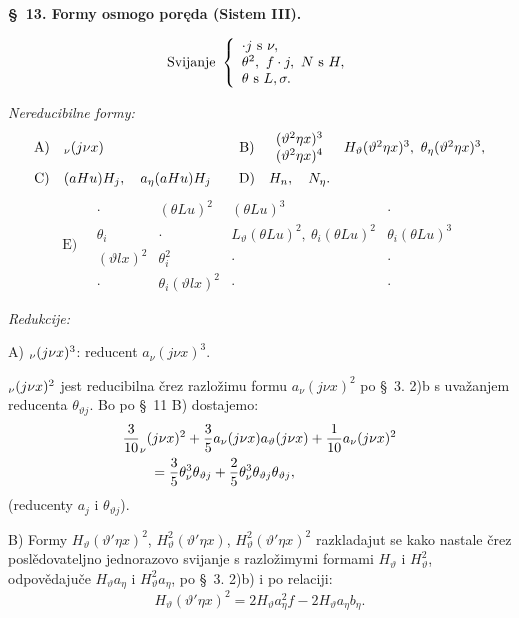 \documentclass[11pt]{article}
\let\A\relax
\newcommand{\A}{\mathfrak A}
\begin{document}
\begin{center}
\textbf{\S\ 13. \quad Formy osmogo poręda (Sistem III).}
\end{center}
\[
\text{Svijanje }\left\{\begin{array}{l}
\A\cdot j \text{ s }\nu,\\
\theta^2,\ f\cdot j,\ N \text{ s }H,\\
\theta \text{ s }L,\sigma.
\end{array}\right.
\]

\noindent\textit{Nereducibilne formy:}
\[
\begin{array}{c@{\quad}l@{\qquad}c@{\quad}l}
\mathrm{A)}&\A_\nu(j\nu x)&
\mathrm{B)}&\begin{array}{c}(\vartheta^2\eta x)^3\\(\vartheta^2\eta x)^4\end{array}
\quad H_\vartheta(\vartheta^2\eta x)^3,
\ \theta_\eta(\vartheta^2\eta x)^3,\\[1em]
\mathrm{C)}&(aHu)H_j,\quad a_\eta(aHu)H_j&
\mathrm{D)}&H_n,\quad N_\eta.
\end{array}
\]
\[
\mathrm{E)}\quad
\begin{array}{c|c|c|c}
\cdot&(\theta Lu)^2&(\theta Lu)^3&\cdot\\
\theta_i&\cdot&L_\vartheta(\theta Lu)^2,
\ \theta_i(\theta Lu)^2&\theta_i(\theta Lu)^3\\
(\vartheta lx)^2&\theta_i^2&\cdot&\cdot\\
\cdot&\theta_i(\vartheta lx)^2&\cdot&\cdot
\end{array}
\]

\noindent\textit{Redukcije:}

\noindent\mbox{A)} $\A_\nu(j\nu x)^3$: reducent $a_\nu(j\nu x)^3$.

$\A_\nu(j\nu x)^2$ jest reducibilna črez razložimu formu $a_\nu(j\nu x)^2$ po \S\ 3. 2)\mbox{b} s uvažanjem reducenta $\theta_{\vartheta j}$. Bo po \S\ 11 \mbox{B)} dostajemo:
\[
\begin{aligned}
&\frac3{10}\A_\nu(j\nu x)^2+\frac35a_\nu(j\nu x)a_\vartheta(j\nu x)
+\frac1{10}a_\nu(j\nu x)^2\\
&\qquad=\frac35\theta_\nu^3\theta_{\vartheta j}
+\frac25\theta_\nu^3\theta_{\vartheta j}\theta_{\vartheta j},
\end{aligned}
\]
(reducenty $a_j$ i $\theta_{\vartheta j}$).

\noindent\mbox{B)} Formy $H_\vartheta(\vartheta'\eta x)^2$, $H_\vartheta^2(\vartheta'\eta x)$, $H_\vartheta^2(\vartheta'\eta x)^2$ razkladajut se kako nastale črez poslědovateljno jednorazovo svijanje s razložimymi formami $H_\vartheta$ i $H_\vartheta^2$, odpovědajuče $H_\vartheta a_\eta$ i $H_\vartheta^2a_\eta$, po \S\ 3. 2)\mbox{b)} i po relaciji:
\[
H_\vartheta(\vartheta'\eta x)^2=2H_\vartheta a_\eta^2f-2H_\vartheta a_\eta b_\eta.
\]
\end{document}
